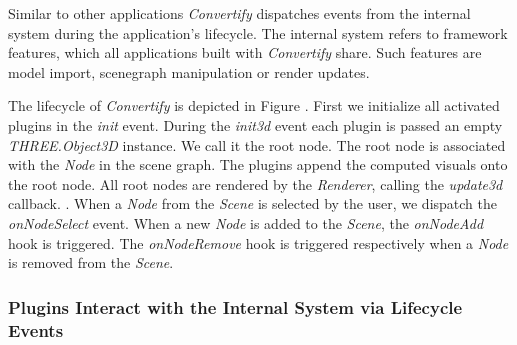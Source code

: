 \documentclass[../ClassicThesis.tex]{subfiles}
\begin{document}
Similar to other applications
\emph{Convertify} dispatches events from the internal system during
the application's lifecycle. The internal system refers to framework
features, which all applications built with \emph{Convertify} share.
Such features are model import, scenegraph manipulation or render
updates.


The lifecycle of \emph{Convertify} is depicted in Figure . First we initialize all activated
plugins in the \emph{init} event. During the \emph{init3d} event each
plugin is passed an empty \emph{THREE.Object3D} instance. We call it
the root node. The root node is associated with the \emph{Node} in the
scene graph. The plugins append the computed visuals onto the root
node. All root nodes are rendered by the \emph{Renderer}, calling the
\emph{update3d} callback. . When a
\emph{Node} from the \emph{Scene} is selected by the user, we dispatch
the \emph{onNodeSelect} event. When a new \emph{Node} is added to the
\emph{Scene}, the \emph{onNodeAdd} hook is triggered. The
\emph{onNodeRemove} hook is triggered respectively when a \emph{Node}
is removed from the \emph{Scene}. 



\subsubsection{Plugins Interact with the Internal System via
  Lifecycle Events}
\end{document}
